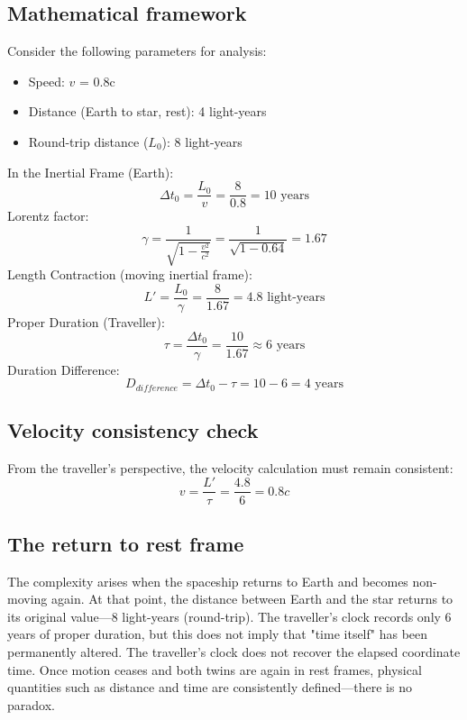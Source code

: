 \documentclass[a4paper,fleqn]{cas-sc}
\begin{document}
	\subsection{Mathematical framework}\label{subsec3_3}
Consider the following parameters for analysis:
		\begin{itemize}
			\item Speed: $v$ = 0.8c
			\item Distance (Earth to star, rest): 4 light-years
			\item Round-trip distance ($L_0$): 8 light-years
		\end{itemize}
In the Inertial Frame (Earth):
		\begin{equation*}
  			\Delta t_0 = \frac{L_0}{v} = \frac{8}{0.8} = 10 \text{ years}
		\end{equation*}
Lorentz factor:
		\begin{equation*}
  			\gamma = \frac{1}{\sqrt{1 - \frac{v^2}{c^2}}} = \frac{1}{\sqrt{1 - 0.64}} = 1.67
		\end{equation*}
Length Contraction (moving inertial frame):
		\begin{equation*}
  			L' = \frac{L_0}{\gamma} = \frac{8}{1.67} = 4.8 \text{ light-years}
		\end{equation*}
Proper Duration (Traveller):
		\begin{equation*}
  			\tau = \frac{\Delta t_0}{\gamma} = \frac{10}{1.67} \approx 6 \text{ years}
		\end{equation*}
Duration Difference:
		\begin{equation*}
  			D_{difference} = \Delta t_0 - \tau = 10 - 6 = 4 \text{ years}
		\end{equation*}
	\subsection{Velocity consistency check}\label{subsec3_4}
		From the traveller's perspective, the velocity calculation must remain consistent:
		\begin{equation*}
  			v = \frac{L'}{\tau} = \frac{4.8}{6} = 0.8c
		\end{equation*}
	\subsection{The return to rest frame}\label{subsec3_5}
The complexity arises when the spaceship returns to Earth and becomes non-moving again. At that point, the distance between Earth and the star returns to its original value—8 light-years (round-trip). The traveller's clock records only 6 years of proper duration, but this does not imply that "time itself" has been permanently altered. The traveller's clock does not recover the elapsed coordinate time. Once motion ceases and both twins are again in rest frames, physical quantities such as distance and time are consistently defined—there is no paradox.
\end{document}
